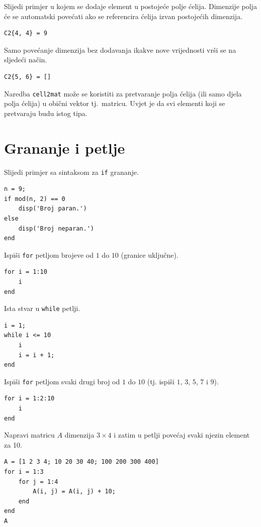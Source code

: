 \documentclass[a4paper, 10pt]{article}
\begin{document}
Slijedi primjer u kojem se dodaje element u postojeće polje ćelija. Dimenzije polja će se automatski povećati ako se referencira ćelija izvan postojećih dimenzija.

\begin{lstlisting}
C2{4, 4} = 9
\end{lstlisting}

Samo povećanje dimenzija bez dodavanja ikakve nove vrijednosti vrši se na sljedeći način.

\begin{lstlisting}
C2{5, 6} = []
\end{lstlisting}

Naredba \texttt{cell2mat} može se koristiti za pretvaranje polja ćelija (ili samo djela polja ćelija) u obični vektor tj.\ matricu. Uvjet je da svi elementi koji se pretvaraju budu istog tipa.

\section{Grananje i petlje}

Slijedi primjer sa sintaksom za \texttt{if} grananje.

\begin{lstlisting}
n = 9;
if mod(n, 2) == 0
    disp('Broj paran.')
else
    disp('Broj neparan.')
end
\end{lstlisting}

Ispiši \texttt{for} petljom brojeve od $1$ do $10$ (granice uključne).

\begin{lstlisting}
for i = 1:10
    i
end
\end{lstlisting}

Ista stvar u \texttt{while} petlji.

\begin{lstlisting}
i = 1;
while i <= 10
    i
    i = i + 1;
end
\end{lstlisting}

Ispiši \texttt{for} petljom svaki drugi broj od $1$ do $10$ (tj. ispiši $1$, $3$, $5$, $7$ i $9$).

\begin{lstlisting}
for i = 1:2:10
    i
end
\end{lstlisting}

Napravi matricu $A$ dimenzija $3 \times 4$ i zatim u petlji povećaj svaki njezin element za 10.

\begin{lstlisting}
A = [1 2 3 4; 10 20 30 40; 100 200 300 400]
for i = 1:3
    for j = 1:4
        A(i, j) = A(i, j) + 10;
    end
end
A
\end{lstlisting}
\end{document}
